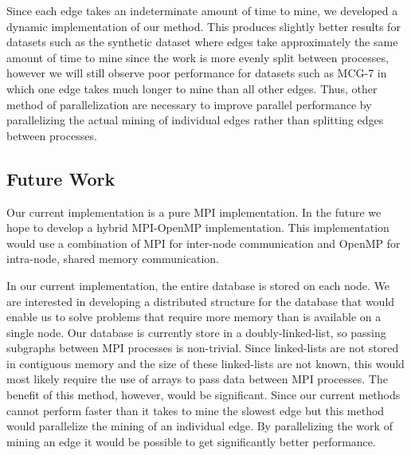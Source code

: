 Since each edge takes an indeterminate amount of time to mine, we developed
a dynamic implementation of our method. This produces slightly better results
for datasets such as the synthetic dataset where edges take approximately
the same amount of time to mine since the work is more evenly split between
processes, however we will still observe poor performance for datasets such as
MCG-7 in which one edge takes much longer to mine than all other edges. Thus,
other method of parallelization are necessary to improve parallel performance
by parallelizing the actual mining of individual edges rather than splitting
edges between processes.

\subsection{Future Work}
\label{subsec:future}

Our current implementation is a pure MPI implementation. In the future we
hope to develop a hybrid MPI-OpenMP implementation. This implementation
would use a combination of MPI for inter-node communication and OpenMP
for intra-node, shared memory communication.

In our current implementation, the entire database is stored on each node.
We are interested in developing a distributed structure for the database that
would enable us to solve problems that require more memory than is available
on a single node. Our database is currently store in a doubly-linked-list, so
passing subgraphs between MPI processes is non-trivial. Since
linked-lists are not stored in contiguous memory and the size of these
linked-lists are not known, this would most likely require the use of arrays
to pass data between MPI processes.
The benefit of this method, however, would be significant. Since our current
methods cannot perform faster than it takes to mine the slowest edge but this
method would parallelize the mining of an individual edge. By parallelizing
the work of mining an edge it would be possible to get significantly better
performance.
